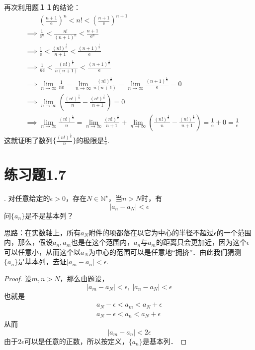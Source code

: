 \documentclass{ctexart}
\theoremstyle{definition}
\theoremstyle{definition}
\theoremstyle{plain}
\theoremstyle{plain}
\theoremstyle{plain}
\theoremstyle{definition}
\begin{document}
再次利用题１１的结论：
\begin{align}
    &\phantom{\implies} \left(\frac{n+1}{\mathrm{e}}\right)^n < n! < \left(\frac{n+1}{\mathrm{e}}\right)^{n+1} \\
    &\implies \frac{1}{\mathrm{e}^n} < \frac{n!}{(n+1)^n} < \frac{n+1}{\mathrm{e}^n} \\
    &\implies \frac{1}{\mathrm{e}} < \frac{(n!)^\frac{1}{n}}{n+1} < \frac{(n+1)^\frac{1}{n}}{\mathrm{e}} \\
    &\implies \frac{1}{n \mathrm{e}} < \frac{(n!)^\frac{1}{n}}{n(n+1)} < \frac{(n+1)^\frac{1}{n}}{\mathrm{e}} \\
    &\implies \lim_{n\to\infty} \frac{1}{n \mathrm{e}} = \lim_{n\to\infty} \frac{(n!)^\frac{1}{n}}{n(n+1)} = \lim_{n\to\infty} \frac{(n+1)^\frac{1}{n}}{\mathrm{e}} = 0 \\
    &\implies \lim_{n\to\infty} \left(\frac{(n!)^\frac{1}{n}}{n} - \frac{(n!)^\frac{1}{n}}{n+1}\right) = 0 \\
    &\implies \lim_{n\to\infty} \frac{(n!)^\frac{1}{n}}{n} = \lim_{n\to\infty} \frac{(n!)^\frac{1}{n}}{n+1} + \lim_{n\to\infty} \left(\frac{(n!)^\frac{1}{n}}{n} - \frac{(n!)^\frac{1}{n}}{n+1}\right) = \frac{1}{\mathrm{e}} + 0 = \frac{1}{\mathrm{e}}
\end{align}
这就证明了数列$\displaystyle \{\frac{(n!)^\frac{1}{n}}{n}\}$的极限是$\displaystyle \frac{1}{\mathrm{e}}$.

\section*{练习题1.7}
. 对任意给定的$\epsilon > 0$，存在$N \in \mathbb{N}^\star$，当$n > N$时，有
\begin{equation}
    |a_n - a_N|<\epsilon
\end{equation}
问$\{a_n\}$是不是基本列？

\noindent 思路：在实数轴上，所有$a_N$附件的项都落在以它为中心的半径不超过$\epsilon$的一个范围内，那么，假设$a_n, a_m$也是在这个范围内，$a_n$与$a_m$的距离只会更加近，因为这个$\epsilon$可以任意小，从而这个以$a_N$为中心的范围可以是任意地``拥挤''．由此我们猜测$\{a_n\}$是基本列，去证$|a_m - a_n|<\epsilon$.

\begin{proof}
设$m, n>N$，那么由题设，
\begin{equation}
    |a_m - a_N|<\epsilon, \; |a_n - a_N| <\epsilon
\end{equation}
也就是
\begin{align}
    a_N - \epsilon < a_m < a_N + \epsilon \\
    a_N - \epsilon < a_n < a_N + \epsilon 
\end{align}
从而
\begin{equation}
    |a_m - a_n| < 2\epsilon
\end{equation}
由于$2\epsilon$可以是任意的正数，所以按定义，$\{a_n\}$是基本列．
\end{proof}
\end{document}
